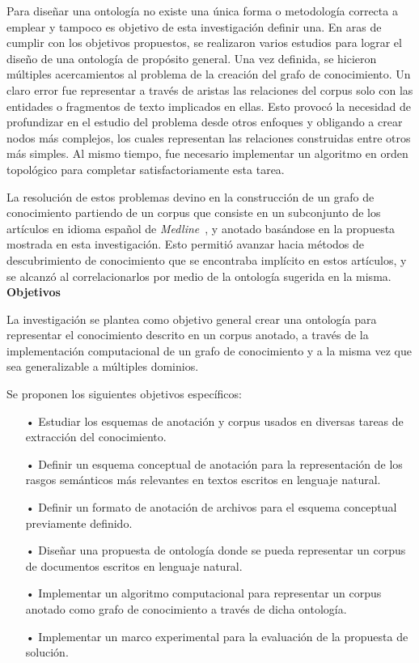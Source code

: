 Para diseñar una ontología no existe una única forma o metodología correcta a emplear y tampoco es objetivo de esta investigación definir una. En aras de cumplir con los objetivos propuestos, se realizaron varios estudios para lograr el diseño de una ontología de propósito general. Una vez definida, se hicieron múltiples acercamientos al problema de la creación del grafo de conocimiento. Un claro error fue representar a través de aristas las relaciones del corpus solo con las entidades o fragmentos de texto implicados en ellas. Esto provocó la necesidad de profundizar en el estudio del problema desde otros enfoques y obligando a crear nodos más complejos, los cuales representan las relaciones construidas entre otros más simples. Al mismo tiempo, fue necesario implementar un algoritmo en orden topológico para completar satisfactoriamente esta tarea.

La resolución de estos problemas devino en la construcción de un grafo de conocimiento partiendo de un corpus que consiste en un subconjunto de los artículos en idioma español de \textit{Medline}~\cite{ref:3}, y anotado basándose en la propuesta mostrada en esta investigación. Esto permitió avanzar hacia métodos de descubrimiento de conocimiento que se encontraba implícito en estos artículos, y se alcanzó al correlacionarlos por medio de la ontología sugerida en la misma.\\

\noindent\textbf{\large Objetivos}

La investigación se plantea como objetivo general crear una ontología para representar el conocimiento descrito en un corpus anotado, a través de la implementación computacional de un grafo de conocimiento y a la misma vez que sea generalizable a múltiples dominios.

Se proponen los siguientes objetivos específicos:
\begin{itemize}
	\vspace{-0.27cm}
	\item[•] Estudiar los esquemas de anotación y corpus usados en diversas tareas de extracción del conocimiento.
	\vspace{-0.27cm}
	\item[•] Definir un esquema conceptual de anotación para la representación de los rasgos semánticos más relevantes en textos escritos en lenguaje natural.
	\vspace{-0.27cm}
	\item[•] Definir un formato de anotación de archivos para el esquema conceptual previamente definido.
	\vspace{-0.27cm}
	\item[•] Diseñar una propuesta de ontología donde se pueda representar un corpus de documentos escritos en lenguaje natural.
	\vspace{-0.27cm}
	\item[•] Implementar un algoritmo computacional para representar un corpus anotado como grafo de conocimiento a través de dicha ontología.
	\vspace{-0.27cm}
	\item[•] Implementar un marco experimental para la evaluación de la propuesta de solución.
\end{itemize}

